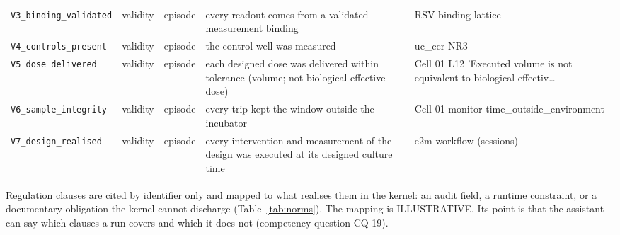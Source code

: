 \documentclass[10pt,a4paper]{article}
\begin{document}
{\begin{xltabular}{\linewidth}{p{3.2cm}lp{1.9cm}Xp{3.0cm}}
\texttt{V3\_\allowbreak{}binding\_\allowbreak{}validated} & validity & episode & every readout comes from a validated measurement binding & RSV binding lattice \\
\texttt{V4\_\allowbreak{}controls\_\allowbreak{}present} & validity & episode & the control well was measured & uc\_\allowbreak{}ccr NR3 \\
\texttt{V5\_\allowbreak{}dose\_\allowbreak{}delivered} & validity & episode & each designed dose was delivered within tolerance (volume; not biological effective dose) & Cell 01 L12 'Executed volume is not equivalent to biological effectiv… \\
\texttt{V6\_\allowbreak{}sample\_\allowbreak{}integrity} & validity & episode & every trip kept the window outside the incubator & Cell 01 monitor time\_\allowbreak{}outside\_\allowbreak{}environment \\
\texttt{V7\_\allowbreak{}design\_\allowbreak{}realised} & validity & episode & every intervention and measurement of the design was executed at its designed culture time & e2m workflow (sessions) \\
\end{xltabular}}

Regulation clauses are cited by identifier only and mapped to what realises them in the kernel: an audit field, a runtime constraint, or a documentary obligation the kernel cannot discharge (Table~\ref{tab:norms}). The mapping is ILLUSTRATIVE. Its point is that the assistant can say which clauses a run covers and which it does not (competency question CQ-19).
\end{document}
